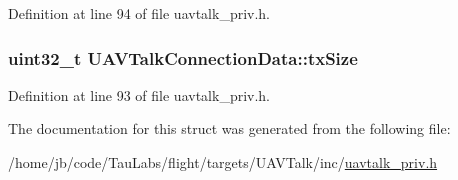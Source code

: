 \-Definition at line 94 of file uavtalk\-\_\-priv.\-h.

\hypertarget{struct_u_a_v_talk_connection_data_a1cac6d157b4dbf6d91882833c7ce304c}{
\subsubsection[{tx\-Size}]{\setlength{\rightskip}{0pt plus 5cm}uint32\-\_\-t {\bf \-U\-A\-V\-Talk\-Connection\-Data\-::tx\-Size}}}\label{struct_u_a_v_talk_connection_data_a1cac6d157b4dbf6d91882833c7ce304c}


\-Definition at line 93 of file uavtalk\-\_\-priv.\-h.



\-The documentation for this struct was generated from the following file\-:\begin{DoxyCompactItemize}
\item 
/home/jb/code/\-Tau\-Labs/flight/targets/\-U\-A\-V\-Talk/inc/\hyperlink{uavtalk__priv_8h}{uavtalk\-\_\-priv.\-h}\end{DoxyCompactItemize}
